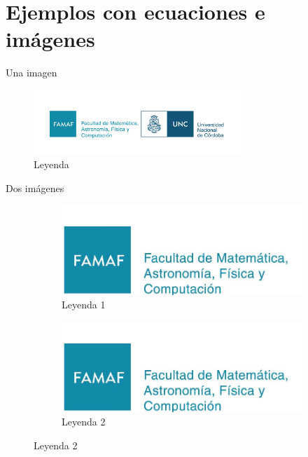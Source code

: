 \section{Ejemplos con ecuaciones e imágenes}


\begin{frame}{Una imagen}
   \begin{figure}[h]
       \centering
       \includegraphics[width=0.7\textwidth]{img/famaf.png}
       \caption{Leyenda}
       \label{fig:label_da_imagem}
   \end{figure}
\end{frame}


\begin{frame}{Dos imágenes}
   \begin{figure}
       \centering
       \begin{subfigure}[b]{0.45\textwidth}
           \centering
           \includegraphics[width=\textwidth]{img/famaf.jpg}
           \caption{Leyenda 1}
           \label{fig:img1}
       \end{subfigure}
       \hfill
       \begin{subfigure}[b]{0.45\textwidth}
           \centering
           \includegraphics[width=\textwidth]{img/famaf.jpg}
           \caption{Leyenda 2}
           \label{fig:img2}
       \end{subfigure}
   \end{figure}
\end{frame}

